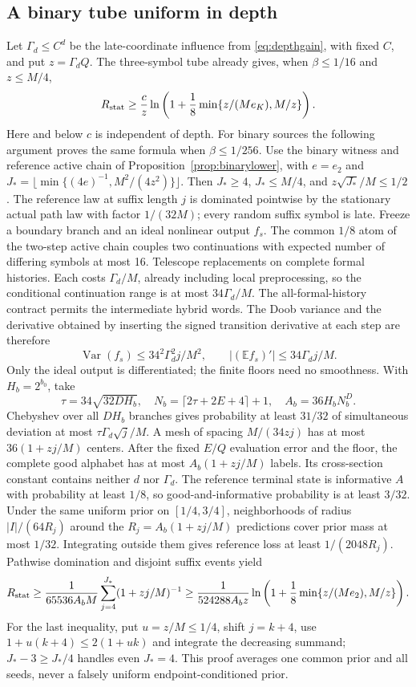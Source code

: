 \documentclass[11pt,letterpaper]{article}
\theoremstyle{definition}\newtheorem{definition}[theorem]{Definition}
\theoremstyle{remark}\newtheorem{remark}[theorem]{Remark}
\newcommand{\E}{\mathbb{E}}
\newcommand{\Var}{\operatorname{Var}}
\begin{document}
\subsection{A binary tube uniform in depth}
Let $\Gamma_d\le C^d$ be the late-coordinate influence from \eqref{eq:depthgain}, with fixed $C$, and put $z=\Gamma_dQ$. The three-symbol tube already gives, when $\beta\le1/16$ and $z\le M/4$,
\[
 R_{\rm stat}\ge\frac c z
 \ln\left(1+\frac18\min\{z/(Me_K),M/z\}\right).
\]
Here and below $c$ is independent of depth. For binary sources the following argument proves the same formula when $\beta\le1/256$.
Use the binary witness and reference active chain of Proposition~\ref{prop:binarylower}, with $e=e_2$ and
$J_*=\lfloor\min\{(4e)^{-1},M^2/(4z^2)\}\rfloor$. Then $J_*\ge4$, $J_*\le M/4$, and $z\sqrt{J_*}/M\le1/2$. The reference law at suffix length $j$ is dominated pointwise by the stationary actual path law with factor $1/(32M)$; every random suffix symbol is late.
Freeze a boundary branch and an ideal nonlinear output $f_s$. The common $1/8$ atom of the two-step active chain couples two continuations with expected number of differing symbols at most 16. Telescope replacements on complete formal histories. Each costs $\Gamma_d/M$, already including local preprocessing, so the conditional continuation range is at most $34\Gamma_d/M$. The all-formal-history contract permits the intermediate hybrid words. The Doob variance and the derivative obtained by inserting the signed transition derivative at each step are therefore
\[
 \Var(f_s)\le34^2\Gamma_d^2j/M^2,\qquad
 |(\E f_s)'|\le34\Gamma_dj/M.
\]
Only the ideal output is differentiated; the finite floors need no smoothness.
With $H_b=2^{b_0}$, take
\[
 \tau=34\sqrt{32DH_b},\quad
 N_b=\lceil2\tau+2E+4\rceil+1,\quad A_b=36H_bN_b^D.
\]
Chebyshev over all $DH_b$ branches gives probability at least $31/32$ of simultaneous deviation at most $\tau\Gamma_d\sqrt j/M$. A mesh of spacing $M/(34zj)$ has at most $36(1+zj/M)$ centers. After the fixed $E/Q$ evaluation error and the floor, the complete good alphabet has at most $A_b(1+zj/M)$ labels. Its cross-section constant contains neither $d$ nor $\Gamma_d$.
The reference terminal state is informative $A$ with probability at least $1/8$, so good-and-informative probability is at least $3/32$. Under the same uniform prior on $[1/4,3/4]$, neighborhoods of radius $|I|/(64R_j)$ around the $R_j=A_b(1+zj/M)$ predictions cover prior mass at most $1/32$. Integrating outside them gives reference loss at least $1/(2048R_j)$. Pathwise domination and disjoint suffix events yield
\[
 R_{\rm stat}\ge\frac1{65536A_bM}\sum_{j=4}^{J_*}(1+zj/M)^{-1}
 \ge\frac1{524288A_bz}
 \ln\left(1+\frac18\min\{z/(Me_2),M/z\}\right).
\]
For the last inequality, put $u=z/M\le1/4$, shift $j=k+4$, use $1+u(k+4)\le2(1+uk)$ and integrate the decreasing summand; $J_*-3\ge J_*/4$ handles even $J_*=4$. This proof averages one common prior and all seeds, never a falsely uniform endpoint-conditioned prior.
\end{document}
